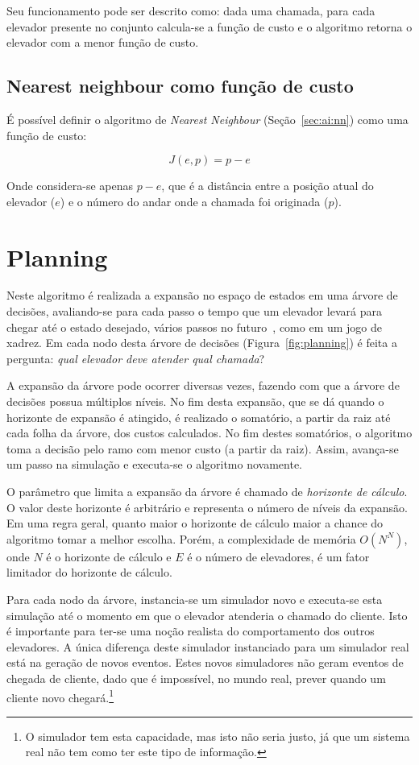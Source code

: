 Seu funcionamento pode ser descrito como: dada uma chamada, para cada elevador
presente no conjunto calcula-se a função de custo e o algoritmo retorna o
elevador com a menor função de custo.

\subsection{Nearest neighbour como função de custo}

É possível definir o algoritmo de \textit{Nearest Neighbour}
(Seção~\ref{sec:ai:nn}) como uma função de custo:

\[J(e, p) = p - e\]

Onde considera-se apenas $p - e$, que é a distância entre a posição atual do
elevador ($e$) e o número do andar onde a chamada foi originada ($p$).

\section{\label{sec:ai:planning}Planning}

Neste algoritmo é realizada a expansão no espaço de estados em uma árvore de
decisões, avaliando-se para cada passo o tempo que um elevador levará para
chegar até o estado desejado, vários passos no
futuro~\cite{Koehler00elevatorcontrol}, como em um jogo de xadrez. Em cada nodo
desta árvore de decisões (Figura~\ref{fig:planning}) é feita a pergunta:
\textit{qual elevador deve atender qual chamada}?

A expansão da árvore pode ocorrer diversas vezes, fazendo com que a árvore de
decisões possua múltiplos níveis. No fim desta expansão, que se dá quando
o horizonte de expansão é atingido, é realizado o somatório, a partir da raiz até
cada folha da árvore, dos custos calculados. No fim destes somatórios, o
algoritmo toma a decisão pelo ramo com menor custo (a partir da raiz). Assim,
avança-se um passo na simulação e executa-se o algoritmo novamente.

O parâmetro que limita a expansão da árvore é chamado de \textit{horizonte de
cálculo}. O valor deste horizonte é arbitrário e representa o número de níveis
da expansão. Em uma regra geral, quanto maior o horizonte de cálculo maior a
chance do algoritmo tomar a melhor escolha. Porém, a complexidade de memória
$O(N^{N})$, onde $N$ é o horizonte de cálculo e $E$ é o número de elevadores,
é um fator limitador do horizonte de cálculo.

Para cada nodo da árvore, instancia-se um simulador novo e executa-se esta
simulação até o momento em que o elevador atenderia o chamado do cliente. Isto é
importante para ter-se uma noção realista do comportamento dos outros
elevadores. A única diferença deste simulador instanciado para um simulador real
está na geração de novos eventos. Estes novos simuladores não geram eventos de
chegada de cliente, dado que é impossível, no mundo real, prever quando um
cliente novo chegará.\footnote{O simulador tem esta capacidade, mas isto não
  seria justo, já que um sistema real não tem como ter este tipo de informação.}

